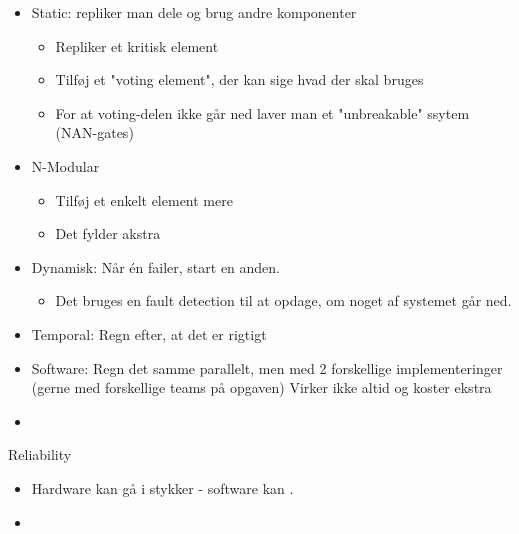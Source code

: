 \documentclass[a4, 10pt]{article}
\begin{document}
\begin{itemize}
	\item Static: repliker man dele og brug andre komponenter
	\begin{itemize}
		\item Repliker et kritisk element
		\item Tilføj et "voting element", der kan sige hvad der skal bruges
		\item For at voting-delen ikke går ned laver man et "unbreakable" ssytem (NAN-gates)
	\end{itemize}

	\item N-Modular
	\begin{itemize}
		\item Tilføj et enkelt element mere

		\item Det fylder akstra
	\end{itemize}

	\item Dynamisk: Når én failer, start en anden.
	\begin{itemize}
		\item Det bruges en fault detection til at opdage, om noget af systemet går ned.
	\end{itemize}

	\item Temporal: Regn efter, at det er rigtigt

	\item Software: Regn det samme parallelt, men med 2 forskellige implementeringer (gerne med forskellige teams på opgaven)
	\subitem Virker ikke altid og koster ekstra

	\item 
\end{itemize}
Reliability

\begin{itemize}
	\item Hardware kan gå i stykker - software kan .
	\item 
\end{itemize}
\end{document}
